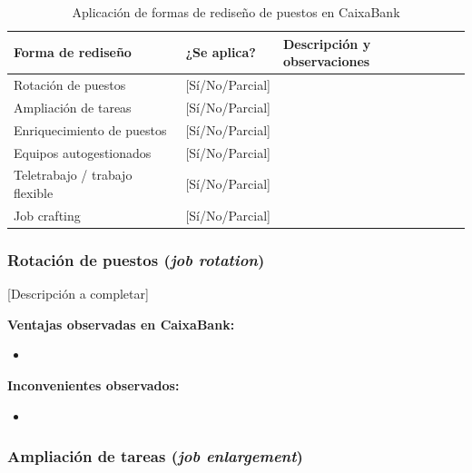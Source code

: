 \begin{table}[H]
  \centering
  \small
  \caption{Aplicación de formas de rediseño de puestos en CaixaBank}
  \begin{tabularx}{\textwidth}{p{} p{} X}
    \toprule
    \textbf{Forma de rediseño}      & \textbf{¿Se aplica?} & \textbf{Descripción y observaciones} \\
    \midrule
    Rotación de puestos             & [Sí/No/Parcial] & \\
    Ampliación de tareas            & [Sí/No/Parcial] & \\
    Enriquecimiento de puestos      & [Sí/No/Parcial] & \\
    Equipos autogestionados         & [Sí/No/Parcial] & \\
    Teletrabajo / trabajo flexible  & [Sí/No/Parcial] & \\
    Job crafting                    & [Sí/No/Parcial] & \\
    \bottomrule
  \end{tabularx}
\end{table}

\subsubsection{Rotación de puestos (\textit{job rotation})}


[Descripción a completar]

\textbf{Ventajas observadas en CaixaBank:}
\begin{itemize}
  \item [...]
\end{itemize}

\textbf{Inconvenientes observados:}
\begin{itemize}
  \item [...]
\end{itemize}

\subsubsection{Ampliación de tareas (\textit{job enlargement})}


